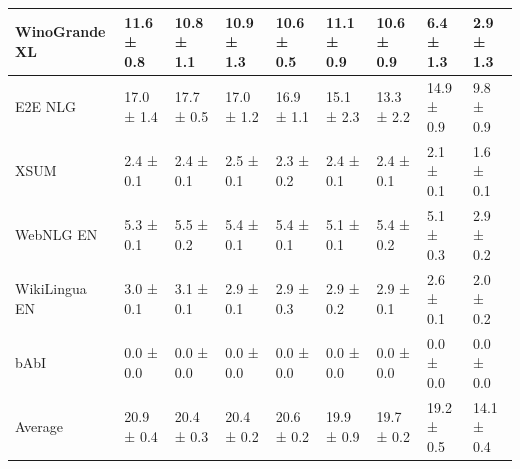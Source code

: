 \documentclass{article}
\begin{document}
\begin{table}[htbp]
{\begin{tabular}{l|llllllll}
WinoGrande XL & 11.6 ± 0.8 & 10.8 ± 1.1 & 10.9 ± 1.3 & 10.6 ± 0.5 & 11.1 ± 0.9 & 10.6 ± 0.9 & 6.4 ± 1.3 & 2.9 ± 1.3 \\
\midrule
E2E NLG & 17.0 ± 1.4 & 17.7 ± 0.5 & 17.0 ± 1.2 & 16.9 ± 1.1 & 15.1 ± 2.3 & 13.3 ± 2.2 & 14.9 ± 0.9 & 9.8 ± 0.9 \\
XSUM & 2.4 ± 0.1 & 2.4 ± 0.1 & 2.5 ± 0.1 & 2.3 ± 0.2 & 2.4 ± 0.1 & 2.4 ± 0.1 & 2.1 ± 0.1 & 1.6 ± 0.1 \\
WebNLG EN & 5.3 ± 0.1 & 5.5 ± 0.2 & 5.4 ± 0.1 & 5.4 ± 0.1 & 5.1 ± 0.1 & 5.4 ± 0.2 & 5.1 ± 0.3 & 2.9 ± 0.2 \\
WikiLingua EN & 3.0 ± 0.1 & 3.1 ± 0.1 & 2.9 ± 0.1 & 2.9 ± 0.3 & 2.9 ± 0.2 & 2.9 ± 0.1 & 2.6 ± 0.1 & 2.0 ± 0.2 \\
\midrule
bAbI & 0.0 ± 0.0 & 0.0 ± 0.0 & 0.0 ± 0.0 & 0.0 ± 0.0 & 0.0 ± 0.0 & 0.0 ± 0.0 & 0.0 ± 0.0 & 0.0 ± 0.0 \\
\midrule
Average & 20.9 ± 0.4 & 20.4 ± 0.3 & 20.4 ± 0.2 & 20.6 ± 0.2 & 19.9 ± 0.9 & 19.7 ± 0.2 & 19.2 ± 0.5 & 14.1 ± 0.4 \\
\bottomrule
  \end{tabular}
  }
  \label{tab:2b8rep}
\end{table}
\end{document}
